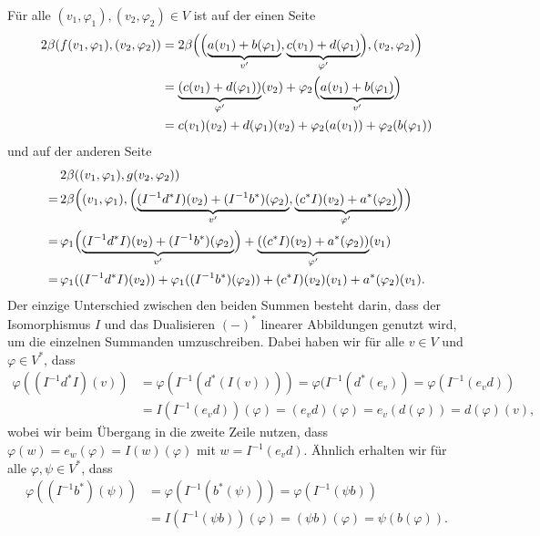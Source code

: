 \documentclass[a4paper,10pt,numbers=noenddot]{scrartcl}
\begin{document}
Für alle $(v_1, \varphi_1), (v_2, \varphi_2) \in V$ ist auf der einen Seite
\begin{align*}
      2\beta(f(v_1, \varphi_1), (v_2, \varphi_2))
  &=  2\beta\Bigl(
              \Bigl(
              \underbrace{a(v_1) + b(\varphi_1)}_{v'},
              \underbrace{c(v_1) + d(\varphi_1)}_{\varphi'}
              \Bigr),
              (v_2, \varphi_2)
            \Bigr)  \\
  &=  \underbrace{(c(v_1) + d(\varphi_1))}_{\varphi'}(v_2)
      + \varphi_2\Bigl( \underbrace{a(v_1) + b(\varphi_1)}_{v'} \Bigr)         \\
  &=  c(v_1)(v_2) + d(\varphi_1)(v_2) + \varphi_2(a(v_1)) + \varphi_2(b(\varphi_1))
\end{align*}
und auf der anderen Seite
\begin{align*}
   &\,  2\beta( (v_1, \varphi_1), g(v_2, \varphi_2) ) \\
  =&\,  2\beta\Bigl(
                (v_1, \varphi_1),
                \Bigl(
                  \underbrace{(I^{-1} d^* I)(v_2) + (I^{-1} b^*)(\varphi_2)}_{v'},
                  \underbrace{(c^* I)(v_2) + a^*(\varphi_2)}_{\varphi'}
                \Bigr)
              \Bigr) \\
  =&\,    \varphi_1\Bigl(
                      \underbrace{(I^{-1} d^* I)(v_2) + (I^{-1} b^*)(\varphi_2)}_{v'}
                    \Bigr)
        + \underbrace{( (c^* I)(v_2) + a^*(\varphi_2) )}_{\varphi'}(v_1)           \\
  =&\,  \varphi_1((I^{-1} d^* I)(v_2)) + \varphi_1((I^{-1} b^*)(\varphi_2)) + (c^* I)(v_2)(v_1) + a^*(\varphi_2)(v_1).
\end{align*}
Der einzige Unterschied zwischen den beiden Summen besteht darin, dass der Isomorphismus $I$ und das Dualisieren $(-)^*$ linearer Abbildungen genutzt wird, um die einzelnen Summanden umzuschreiben.
Dabei haben wir für alle $v \in V$ und $\varphi \in V^*$, dass
\begin{align*}
      \varphi( (I^{-1} d^* I)(v) )
  &=  \varphi( I^{-1}( d^*( I( v ) ) ) )
   =  \varphi( I^{-1}( d^*( e_v ) )
   =  \varphi( I^{-1}( e_v d ) )        \\
  &=  I(I^{-1}(e_v d))(\varphi)
   =  (e_v d)(\varphi)
   =  e_v(d(\varphi))
   =  d(\varphi)(v),
\end{align*}
wobei wir beim Übergang in die zweite Zeile nutzen, dass $\varphi(w) = e_w(\varphi) = I(w)(\varphi)$ mit $w = I^{-1}(e_v d)$.
Ähnlich erhalten wir für alle $\varphi, \psi \in V^*$, dass
\begin{align*}
      \varphi((I^{-1} b^*)(\psi))
  &=  \varphi( I^{-1}( b^*(\psi) ) )
   =  \varphi( I^{-1} (\psi b) )      \\
  &=  I( I^{-1}(\psi b) )(\varphi)
   =  (\psi b)(\varphi)
   =  \psi(b(\varphi)).
\end{align*}
\end{document}
